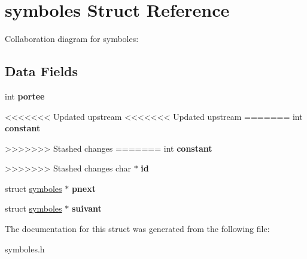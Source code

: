 \hypertarget{structsymboles}{}\section{symboles Struct Reference}
\label{structsymboles}


Collaboration diagram for symboles\+:
\subsection*{Data Fields}
\begin{DoxyCompactItemize}
\item 
\mbox{\label{structsymboles_a8acd5efd1a635a1173215f53ae15e7fb}} 
int {\bfseries portee}
\item 
<<<<<<< Updated upstream
<<<<<<< Updated upstream
=======
\mbox{\label{structsymboles_ac347bb44c6dc857729453831c5714f84}} 
int {\bfseries constant}
\item 
>>>>>>> Stashed changes
=======
\mbox{\label{structsymboles_ac347bb44c6dc857729453831c5714f84}} 
int {\bfseries constant}
\item 
>>>>>>> Stashed changes
\mbox{\label{structsymboles_aecb3b0d045ada529257a2fbf8f829599}} 
char $\ast$ {\bfseries id}
\item 
\mbox{\label{structsymboles_ae5a917e10d2aea4d16dac81c9556c73c}} 
struct \hyperlink{structsymboles}{symboles} $\ast$ {\bfseries pnext}
\item 
\mbox{\label{structsymboles_a4099297665249f509ea61361ce4a1a73}} 
struct \hyperlink{structsymboles}{symboles} $\ast$ {\bfseries suivant}
\end{DoxyCompactItemize}


The documentation for this struct was generated from the following file\+:\begin{DoxyCompactItemize}
\item 
symboles.\+h\end{DoxyCompactItemize}
